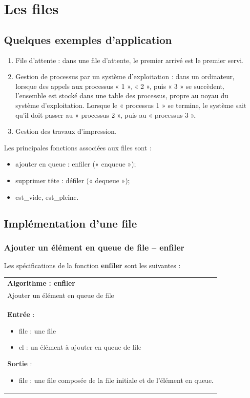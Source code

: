 \documentclass[10pt,fleqn]{article} %
\begin{document}
\section{Les files}
\subsection{Quelques exemples d'application}

\begin{enumerate}
\item File d’attente : dans une file d’attente, le premier arrivé est le premier servi.
\item Gestion de processus par un système d’exploitation : dans un ordinateur, lorsque des appels aux processus « 1 », « 2 », puis « 3 » se succèdent, l’ensemble est stocké dans une table des processus, propre au noyau du système d’exploitation. Lorsque le « processus 1 » se termine, le système sait qu’il doit passer au « processus 2 », puis au « processus 3 ».
\item Gestion des travaux d'impression.
\end{enumerate}


\begin{rem}
Les principales fonctions associées aux files sont : 
\begin{itemize}
\item ajouter en queue : enfiler (« enqueue »);
\item supprimer tête : défiler (« dequeue »);
\item est\_vide, est\_pleine.
\end{itemize}
\end{rem}


\subsection{Implémentation d'une file}

\subsubsection{Ajouter un élément en queue de file -- \textbf{enfiler}}
Les spécifications de la fonction \textbf{enfiler} sont les suivantes :

\begin{tabular}{p{\linewidth}}
\hline
\textbf{Algorithme : enfiler} \\
Ajouter un élément en queue de file \\
\hline
\textbf{Entrée} : 
\begin{itemize}
\item file : une file
\item el : un élément à ajouter en queue de file
\end{itemize}
\textbf{Sortie} : 
\begin{itemize}
\item file  : une file composée de la file initiale et de l'élément en queue.
\end{itemize} \\
\hline 
\end{tabular}
\end{document}
